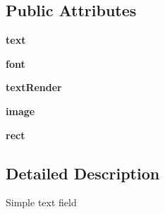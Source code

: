\subsection*{\-Public \-Attributes}
\begin{DoxyCompactItemize}
\item 
\hypertarget{classinterface_1_1gui_1_1gui__elements_1_1_text_field_a1c28cf3754b1ababe45b7db1d664d43c}{{\bfseries text}}\label{classinterface_1_1gui_1_1gui__elements_1_1_text_field_a1c28cf3754b1ababe45b7db1d664d43c}

\item 
\hypertarget{classinterface_1_1gui_1_1gui__elements_1_1_text_field_ab94c4b41a968fbafa8c8c17ee424a88b}{{\bfseries font}}\label{classinterface_1_1gui_1_1gui__elements_1_1_text_field_ab94c4b41a968fbafa8c8c17ee424a88b}

\item 
\hypertarget{classinterface_1_1gui_1_1gui__elements_1_1_text_field_a28ccc6e05e7450fff2c1c1fcf743db90}{{\bfseries text\-Render}}\label{classinterface_1_1gui_1_1gui__elements_1_1_text_field_a28ccc6e05e7450fff2c1c1fcf743db90}

\item 
\hypertarget{classinterface_1_1gui_1_1gui__elements_1_1_text_field_af6faa5563fdbb8685da5d1fb10fb2b6c}{{\bfseries image}}\label{classinterface_1_1gui_1_1gui__elements_1_1_text_field_af6faa5563fdbb8685da5d1fb10fb2b6c}

\item 
\hypertarget{classinterface_1_1gui_1_1gui__elements_1_1_text_field_a708ed460ce01267eb3e8d75f63acc637}{{\bfseries rect}}\label{classinterface_1_1gui_1_1gui__elements_1_1_text_field_a708ed460ce01267eb3e8d75f63acc637}

\end{DoxyCompactItemize}


\subsection{\-Detailed \-Description}
\begin{DoxyVerb}Simple text field \end{DoxyVerb}
 

